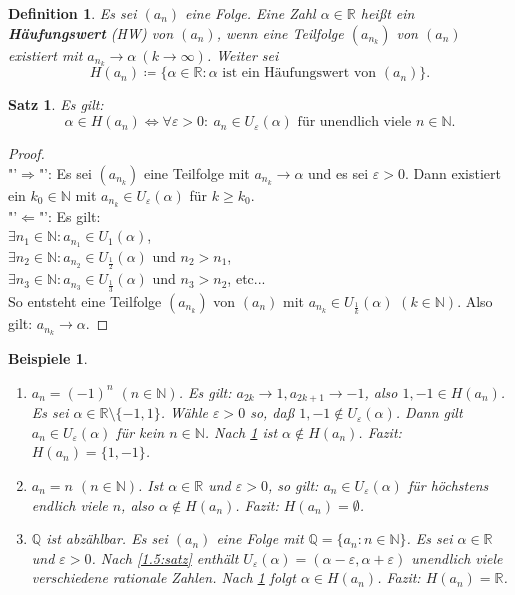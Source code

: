 \documentclass[12pt]{extreport} %
\newcommand{\N}{\mathbb{N}}
\newcommand{\Q}{\mathbb{Q}}
\newcommand{\R}{\mathbb{R}}
\theoremstyle{named}
\theoremstyle{itshape}
\newtheorem{satz}[unnamedtheorem]{Satz}
\newtheorem*{definition}{Definition}
\theoremstyle{normal}
\newtheorem*{beispiele}{Beispiele}
\begin{document}
\begin{definition}
	Es sei $(a_{n})$ eine Folge. Eine Zahl $\alpha \in \R$ hei{\ss}t ein \textbf{Häufungswert} (HW) von $(a_{n})$,
	wenn eine Teilfolge  $(a_{n_{k}})$ von $(a_{n})$ existiert mit $a_{n_{k}} \rightarrow \alpha ~(k \rightarrow \infty)$. Weiter sei	
	$$
	H(a_{n}) \coloneqq \{ \alpha \in \R: \alpha \text{ ist ein Häufungswert von } (a_{n}) \}.
	$$
	
\end{definition}


\begin{satz} \label{2.10:satz} Es gilt:
	$$
	 \alpha \in H(a_{n})  \iff \forall \varepsilon > 0: ~ a_{n} \in U_{\varepsilon}(\alpha) \text{ für unendlich viele }  n \in \N. 
	$$
\end{satz}

\begin{proof} ~\\
	"'$\Rightarrow$"': Es sei $(a_{n_{k}})$ eine Teilfolge mit $a_{n_{k}} \rightarrow \alpha$ und es sei $\varepsilon > 0$. Dann existiert ein $k_{0} \in \N$ mit
	$a_{n_{k}} \in U_{\varepsilon}(\alpha)$ für $k \geq k_{0}$. \\
	"'$\Leftarrow$"': Es gilt: \\
	$\exists n_{1} \in \N: a_{n_{1}} \in U_{1}(\alpha)$, \\
	$\exists n_{2} \in \N: a_{n_{2}} \in U_{\frac{1}{2}}(\alpha)$ und $n_{2} > n_{1}$, \\
	$\exists n_{3} \in \N: a_{n_{3}} \in U_{\frac{1}{3}}(\alpha)$ und $n_{3} > n_{2}$,  etc... \\
	So entsteht eine Teilfolge $(a_{n_{k}})$ von $(a_{n})$ mit $a_{n_{k}} \in U_{\frac{1}{k}}(\alpha)$ $(k \in \N)$.
	Also gilt: $a_{n_{k}} \rightarrow \alpha$. 
\end{proof}


\begin{beispiele}\
	\begin{enumerate}
		\item $a_{n} = (-1)^{n}$ $(n \in \N)$. Es gilt: $a_{2k} \rightarrow 1, a_{2k+1} \rightarrow -1$, also $1, -1 \in H(a_{n})$. 
		Es sei $\alpha \in \R\setminus \{-1,1\}$. Wähle $\varepsilon>0$ so, da{\ss} $1, -1 \notin U_{\varepsilon}(\alpha)$. Dann gilt $a_{n} \in U_{\varepsilon}(\alpha)$ für kein 
		$n \in \N$. Nach \ref{2.10:satz} ist $\alpha \notin H(a_{n})$. Fazit: $H(a_{n}) = \{ 1, -1 \}$.
		\item $a_{n} = n$ $(n \in \N)$. Ist $\alpha \in \R$ und $\varepsilon > 0$, so gilt: $a_{n} \in U_{\varepsilon}(\alpha)$ für höchstens endlich viele $n$, 
		also $\alpha \notin H(a_{n})$. Fazit: $H(a_{n}) = \emptyset$.
		\item $\Q$ ist abzählbar. Es sei $(a_{n})$ eine Folge mit $\Q = \{a_{n}: n \in \N\}$. Es sei $\alpha \in \R$ und $\varepsilon > 0$. Nach {\ref{1.5:satz}} 
		enthält $U_{\varepsilon}(\alpha) = (\alpha - \varepsilon, \alpha + \varepsilon)$ unendlich viele verschiedene rationale Zahlen. Nach {\ref{2.10:satz}} folgt 
		$\alpha \in H(a_{n})$. Fazit: $H(a_{n}) = \R$.
	\end{enumerate}	
\end{beispiele}
\end{document}
